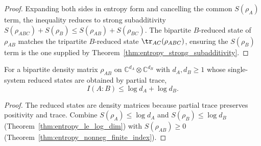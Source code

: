 \begin{proof}\leanok
    Expanding both sides in entropy form and cancelling the common
    $S(\rho_A)$ term, the inequality reduces to strong subadditivity
    $S(\rho_{ABC}) + S(\rho_B) \le S(\rho_{AB}) + S(\rho_{BC})$. The
    bipartite $B$-reduced state of $\rho_{AB}$ matches the tripartite
    $B$-reduced state $\tr_{AC}(\rho_{ABC})$, ensuring the $S(\rho_B)$
    term is the one supplied by Theorem~\ref{thm:entropy_strong_subadditivity}.
\end{proof}

\begin{theorem}
    \label{thm:mutual_information_le_log_dim_add_log_dim}
    \leanok
    For a bipartite density matrix $\rho_{AB}$ on
    $\mathbb{C}^{d_A} \otimes \mathbb{C}^{d_B}$ with $d_A, d_B \ge 1$
    whose single-system reduced states are obtained by partial trace,
    \[
        I(A{:}B) \le  \log d_A + \log d_B.
    \]
\end{theorem}

\begin{proof}\leanok
    The reduced states are density matrices because partial trace preserves
    positivity and trace. Combine $S(\rho_A) \le \log d_A$ and
    $S(\rho_B) \le \log d_B$ (Theorem~\ref{thm:entropy_le_log_dim})
    with $S(\rho_{AB}) \ge 0$
    (Theorem~\ref{thm:entropy_nonneg_finite_index}).
\end{proof}

